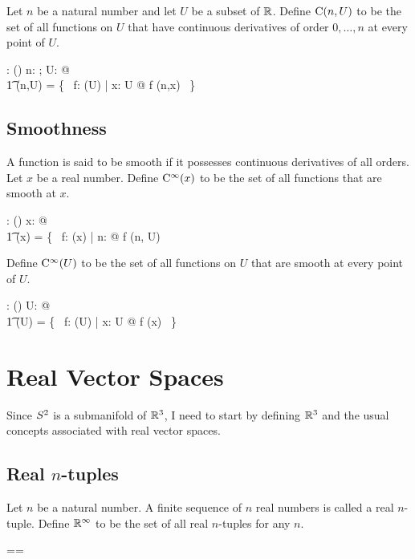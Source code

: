 \documentclass[11pt, oneside]{article}
\begin{document}
Let $n$ be a natural number and let $U$ be a subset of $\mathbb{R}$.
Define $\operatorname{C}(n,U)$ to be the set of all functions on $U$ that have continuous derivatives of order $0, \ldots, n$
at every point of $U$.
\begin{axdef}
	\CnPR: \nat \cross \power \R \fun \power(\R \pfun \R)
\where
	\forall n: \nat; U: \power \R @ \\
	\t1	\CnPR(n,U) = \{~ f: \FunPR(U) | \forall x: U @ f \in \CnR(n,x) ~\}
\end{axdef}

\subsection{Smoothness}

A function is said to be smooth if it possesses continuous derivatives of all orders.
Let $x$ be a real number.
Define $\operatorname{C^{\infty}}(x)$ to be the set of all functions that are smooth at $x$.
\begin{axdef}
	\smoothR: \R \fun \power(\R \pfun \R)
\where
	\forall x: \R @ \\
	\t1	\smoothR(x) = \{~ f: \FunR(x) | \forall n: \nat @ f \in \CnR(n, U)
\end{axdef}

Define $\operatorname{C^{\infty}}(U)$ to be the set of all functions on $U$ that are smooth at every point of $U$.
\begin{axdef}
	\smoothPR: \power \R \fun (\power \R \pfun \R)
\where
	\forall U: \power \R @ \\
	\t1	\smoothPR(U) = \{~ f: \FunPR(U) | \forall x: U @ f \in \smoothR(x) ~\}
\end{axdef}

\section{Real Vector Spaces}

Since $S^2$ is a submanifold of $\mathbb{R}^3$, I need to start by defining $\mathbb{R}^3$ and the usual concepts 
associated with real vector spaces.

\subsection{Real $n$-tuples}

Let $n$ be a natural number.
A finite sequence of $n$ real numbers is called a real $n$-tuple.
Define $\mathbb{R}^\infty$ to be the set of all real $n$-tuples for any $n$.
\begin{zed}
	\Rinf == \seq \R
\end{zed}
\end{document}
